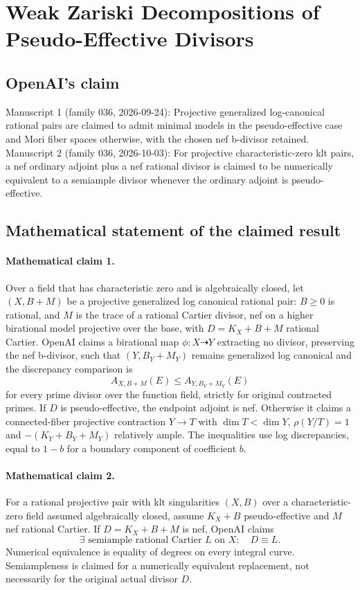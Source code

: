 \documentclass[11pt]{article}
\begin{document}
\section*{Weak Zariski Decompositions of Pseudo-Effective Divisors}

\subsection{OpenAI's claim}
Manuscript 1 (family 036, 2026-09-24): Projective generalized log-canonical rational pairs are claimed to admit minimal models in the pseudo-effective case and Mori fiber spaces otherwise, with the chosen nef b-divisor retained. Manuscript 2 (family 036, 2026-10-03): For projective characteristic-zero klt pairs, a nef ordinary adjoint plus a nef rational divisor is claimed to be numerically equivalent to a semiample divisor whenever the ordinary adjoint is pseudo-effective.

\subsection{Mathematical statement of the claimed result}
\paragraph{Mathematical claim 1.} Over a field that has characteristic zero and is algebraically closed, let $(X,B+M)$ be a projective generalized log canonical rational pair: $B\ge0$ is rational, and $M$ is the trace of a rational Cartier divisor, nef on a higher birational model projective over the base, with $D=K_X+B+M$ rational Cartier. OpenAI claims a birational map $\phi:X\dashrightarrow Y$ extracting no divisor, preserving the nef b-divisor, such that $(Y,B_Y+M_Y)$ remains generalized log canonical and the discrepancy comparison is
\[
A_{X,B+M}(E)\le A_{Y,B_Y+M_Y}(E)
\]
for every prime divisor over the function field, strictly for original contracted primes. If $D$ is pseudo-effective, the endpoint adjoint is nef. Otherwise it claims a connected-fiber projective contraction $Y\to T$ with $\dim T<\dim Y$, $\rho(Y/T)=1$ and $-(K_Y+B_Y+M_Y)$ relatively ample. The inequalities use log discrepancies, equal to $1-b$ for a boundary component of coefficient $b$.

\paragraph{Mathematical claim 2.} For a rational projective pair with klt singularities $(X,B)$ over a characteristic-zero field assumed algebraically closed, assume $K_X+B$ pseudo-effective and $M$ nef rational Cartier. If $D=K_X+B+M$ is nef, OpenAI claims
\[
\exists\text{ semiample rational Cartier }L\text{ on }X:\quad D\equiv L.
\]
Numerical equivalence is equality of degrees on every integral curve. Semiampleness is claimed for a numerically equivalent replacement, not necessarily for the original actual divisor $D$.
\end{document}
